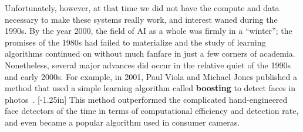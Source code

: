 Unfortunately, however, at that time we did not have the compute and data necessary to make these systems really work, and interest waned during the 1990s. By the year 2000, the field of AI as a whole was firmly in a ``winter''; the promises of the 1980s had failed to materialize and the study of learning algorithms continued on without much fanfare in just a few corners of academia. Nonetheless, several major advances did occur in the relative quiet of the 1990s and early 2000s.
For example, in 2001, Paul Viola and Michael Jones published a method that used a simple learning algorithm called {\bf boosting} to detect faces in photos~\cite{Viola01}.
[-1.25in]
This method outperformed the complicated hand-engineered face detectors of the time in terms of computational efficiency and detection rate, and even became a popular algorithm used in consumer cameras.



